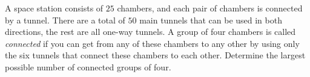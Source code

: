 A space station consists of $25$ chambers, and each pair of chambers is connected by a tunnel.
There are a total of $50$ main tunnels that can be used in both directions,
the rest are all one-way tunnels. A group of four chambers is called \emph{connected} if you can
get from any of these chambers to any other by using only the six tunnels that connect
these chambers to each other. Determine the largest possible number of connected groups of four.

